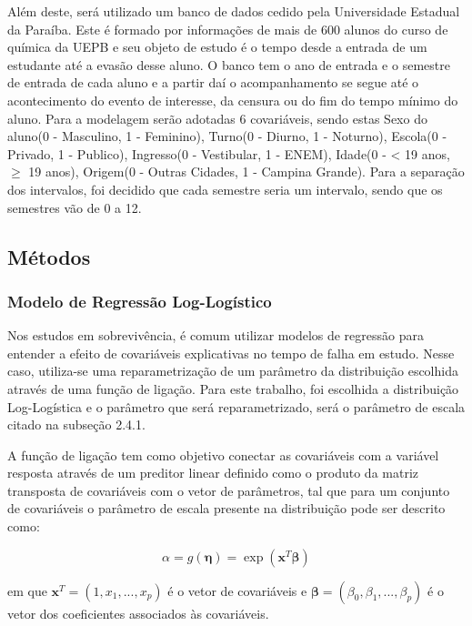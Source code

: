 \documentclass[a4paper,12pt]{article}
\begin{document}
Além deste, será utilizado um banco de dados cedido pela Universidade Estadual da Paraíba. Este é formado por informações de mais de 600 alunos do curso de química da UEPB e seu objeto de estudo é o tempo desde a entrada de um estudante até a evasão desse aluno. O banco tem o ano de entrada e o semestre de entrada de cada aluno e a partir daí o acompanhamento se segue até o acontecimento do evento de interesse, da censura ou do fim do tempo mínimo do aluno. Para a modelagem serão adotadas 6 covariáveis, sendo estas Sexo do aluno(0 - Masculino, 1 - Feminino), Turno(0 - Diurno, 1 - Noturno), Escola(0 - Privado, 1 - Publico), Ingresso(0 - Vestibular, 1 - ENEM), Idade(0 - < 19 anos, $\ge$ 19 anos), Origem(0 - Outras Cidades, 1 - Campina Grande). Para a separação dos intervalos, foi decidido que cada semestre seria um intervalo, sendo que os semestres vão de 0 a 12.

\subsection{Métodos}

\subsubsection{Modelo de Regressão Log-Logístico}

Nos estudos em sobrevivência, é comum utilizar modelos de regressão para entender a efeito de covariáveis explicativas no tempo de falha em estudo. Nesse caso, utiliza-se uma reparametrização de um parâmetro da distribuição escolhida através de uma função de ligação. Para este trabalho, foi escolhida a distribuição Log-Logística e o parâmetro que será reparametrizado, será o parâmetro de escala citado na subseção 2.4.1.

A função de ligação tem como objetivo conectar as covariáveis com a variável resposta através de um preditor linear definido como o produto da matriz transposta de covariáveis com o vetor de parâmetros, tal que para um conjunto de covariáveis o parâmetro de escala presente na distribuição pode ser descrito como:

\begin{equation} \label{eq:lig}
  \alpha = g(\boldsymbol{\eta}) = \exp(\boldsymbol{x}^T\boldsymbol{\beta})
\end{equation}

em que $\boldsymbol{x}^T = (1, x_1, ..., x_p)$ é o vetor de covariáveis e $\boldsymbol{\beta} = (\beta_0, \beta_1, ..., \beta_p)$ é o vetor dos coeficientes associados às covariáveis.
\end{document}
